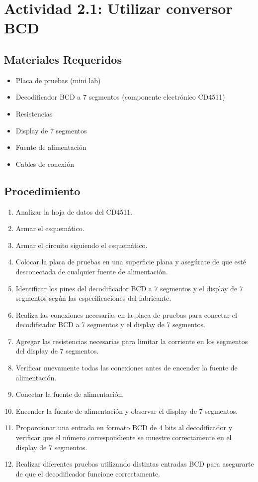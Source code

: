 \section{Actividad 2.1: Utilizar conversor BCD}
\subsection{Materiales Requeridos}
\begin{itemize}
    \setlength\itemsep{0.1em} %
    \item Placa de pruebas (mini lab)
    \item Decodificador BCD a 7 segmentos (componente electrónico CD4511)
    \item Resistencias
    \item Display de 7 segmentos
    \item Fuente de alimentación
    \item Cables de conexión
\end{itemize}

\subsection{Procedimiento}
\begin{enumerate}
    \setlength\itemsep{0.1em} %
    \item Analizar la hoja de datos del CD4511.
    \item Armar el esquemático.
    \item Armar el circuito siguiendo el esquemático.
    \item Colocar la placa de pruebas en una superficie plana y asegúrate de que esté desconectada de cualquier fuente de alimentación.
    \item Identificar los pines del decodificador BCD a 7 segmentos y el display de 7 segmentos según las especificaciones del fabricante.
    \item Realiza las conexiones necesarias en la placa de pruebas para conectar el decodificador BCD a 7 segmentos y el display de 7 segmentos.
    \item Agregar las resistencias necesarias para limitar la corriente en los segmentos del display de 7 segmentos.
    \item Verificar nuevamente todas las conexiones antes de encender la fuente de alimentación.
    \item Conectar la fuente de alimentación.
    \item Encender la fuente de alimentación y observar el display de 7 segmentos.
    \item Proporcionar una entrada en formato BCD de 4 bits al decodificador y verificar que el número correspondiente se muestre correctamente en el display de 7 segmentos.
    \item Realizar diferentes pruebas utilizando distintas entradas BCD para asegurarte de que el decodificador funcione correctamente.
\end{enumerate}


